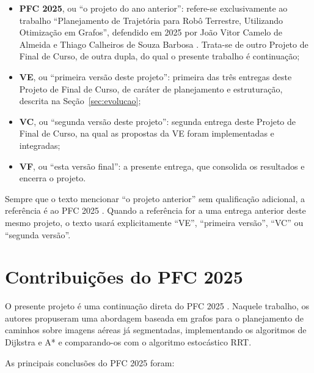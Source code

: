 \documentclass[
    12pt,
    openright,
    oneside,
    a4paper,
    english,
    brazil
]{abntex2}
\begin{document}
\begin{itemize}
    \item \textbf{PFC 2025}, ou ``o projeto do ano anterior'': refere-se exclusivamente ao trabalho ``Planejamento de Trajetória para Robô Terrestre, Utilizando Otimização em Grafos'', defendido em 2025 por João Vitor Camelo de Almeida e Thiago Calheiros de Souza Barbosa \cite{camelo2025}. Trata-se de outro Projeto de Final de Curso, de outra dupla, do qual o presente trabalho é continuação;
    \item \textbf{VE}, ou ``primeira versão deste projeto'': primeira das três entregas deste Projeto de Final de Curso, de caráter de planejamento e estruturação, descrita na Seção~\ref{sec:evolucao};
    \item \textbf{VC}, ou ``segunda versão deste projeto'': segunda entrega deste Projeto de Final de Curso, na qual as propostas da VE foram implementadas e integradas;
    \item \textbf{VF}, ou ``esta versão final'': a presente entrega, que consolida os resultados e encerra o projeto.
\end{itemize}

Sempre que o texto mencionar ``o projeto anterior'' sem qualificação adicional, a referência é ao PFC 2025 \cite{camelo2025}. Quando a referência for a uma entrega anterior deste mesmo projeto, o texto usará explicitamente ``VE'', ``primeira versão'', ``VC'' ou ``segunda versão''.

\section{Contribuições do PFC 2025}
\label{sec:pfc2025}

O presente projeto é uma continuação direta do PFC 2025 \cite{camelo2025}. Naquele trabalho, os autores propuseram uma abordagem baseada em grafos para o planejamento de caminhos sobre imagens aéreas já segmentadas, implementando os algoritmos de Dijkstra e A* e comparando-os com o algoritmo estocástico RRT.

As principais conclusões do PFC 2025 foram:
\end{document}
